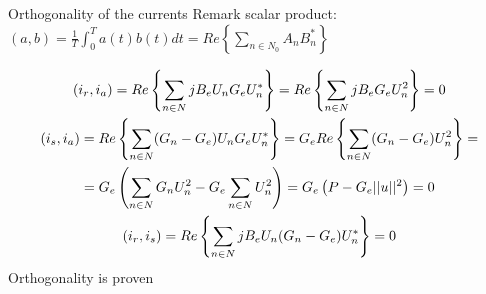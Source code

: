 \documentclass[aspectratio=169]{beamer}
\begin{document}
  \begin{frame}{Orthogonality of the currents}{\insertsection}
    Remark scalar product: $(a,b) = \frac{1}{T}\int_{0}^{T}a(t)b(t)dt=Re\left\{\sum_{n\in N_0}A_nB_n^*\right\}$
  
    \begin{gather}
      (i_r, i_a) = Re\left\{\sum_{n \in N}jB_eU_nG_eU_n^*\right\} =  Re\left\{\sum_{n \in N}jB_eG_eU_n^2\right\} = 0\\
      (i_s, i_a) = Re\left\{\sum_{n \in N}(G_n-G_e)U_nG_eU_n^*\right\} = G_e Re\left\{\sum_{n \in N}(G_n-G_e)U_n^2\right\} = \notag\\
      = G_e\left( \sum_{n\in N}G_nU_n^2-G_e\sum_{n\in N}U_n^2\right) = G_e\left(P-G_e||u||^2\right)=0\\
      (i_r, i_s) = Re\left\{\sum_{n\in N}jB_eU_n(G_n-G_e)U_n^*\right\}=0
    \end{gather}
    Orthogonality is proven
  \end{frame}
      
\end{document}
